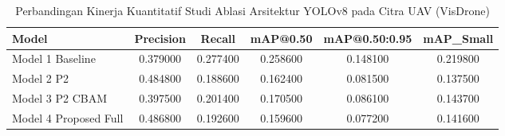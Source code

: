 \begin{table}[htbp]
\caption{Perbandingan Kinerja Kuantitatif Studi Ablasi Arsitektur YOLOv8 pada Citra UAV (VisDrone)}
\label{tab:uav_ablation_results}
\begin{tabular}{lccccc}
\toprule
Model & Precision & Recall & mAP@0.50 & mAP@0.50:0.95 & mAP_Small \\
\midrule
Model 1 Baseline & 0.379000 & 0.277400 & 0.258600 & 0.148100 & 0.219800 \\
Model 2 P2 & 0.484800 & 0.188600 & 0.162400 & 0.081500 & 0.137500 \\
Model 3 P2 CBAM & 0.397500 & 0.201400 & 0.170500 & 0.086100 & 0.143700 \\
Model 4 Proposed Full & 0.486800 & 0.192600 & 0.159600 & 0.077200 & 0.141600 \\
\bottomrule
\end{tabular}
\end{table}
